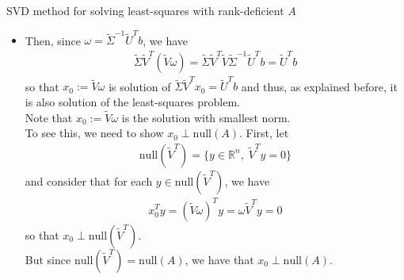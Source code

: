 \documentclass[t,usepdftitle=false]{beamer}
\begin{document}
\begin{frame}{SVD method for solving least-squares with rank-deficient $A$}
\begin{itemize}
\item[] Then, since $\omega=\widetilde{\Sigma}^{-1}\widetilde{U}^Tb$, we have
\begin{align*}
\widetilde{\Sigma}\widetilde{V}^T(\widetilde{V}\omega)=\widetilde{\Sigma}\widetilde{V}^T\widetilde{V}\tilde{\Sigma}^{-1}\widetilde{U}^Tb=\widetilde{U}^Tb
\end{align*}
so that $x_0:=\widetilde{V}\omega$ is solution of $\widetilde{\Sigma}\widetilde{V}^Tx_0=\widetilde{U}^Tb$ and thus, as explained before, it is also solution of the least-squares problem.\vspace{.1cm}\\
Note that $x_0:=\widetilde{V}\omega$ is the solution with smallest norm.\vspace{.1cm}\\
To see this, we need to show $x_0\perp\mathrm{null}(A)$.
First, let 
\begin{align*}
\mathrm{null}(\widetilde{V}^T)=\{y\in\mathbb{R}^n,\;\widetilde{V}^Ty=0\}
\end{align*} 
and consider that for each $y\in\mathrm{null}(\widetilde{V}^T)$, we have 
\begin{align*}
x_0^Ty=(\widetilde{V}\omega)^Ty=\omega\widetilde{V}^Ty=0
\end{align*}
so that $x_0\perp \mathrm{null}(\widetilde{V}^T)$.\vspace{.1cm}\\
But since $\mathrm{null}(\widetilde{V}^T)=\mathrm{null}(A)$, we have that $x_0\perp\mathrm{null}(A)$.
\end{itemize}
\end{frame}
\end{document}
